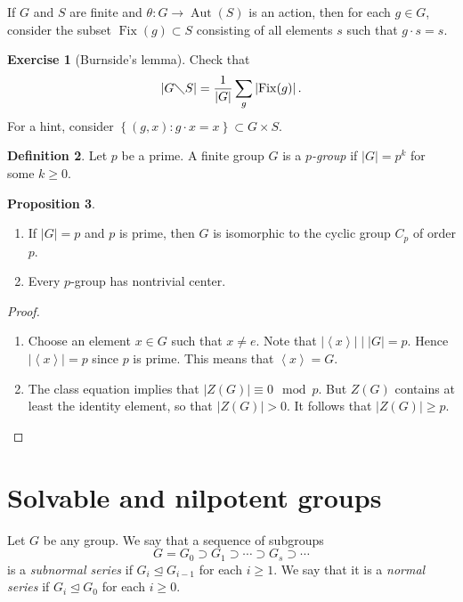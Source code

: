 \documentclass[10pt,letterpaper,cm]{nupset}
\theoremstyle{definition}
\newtheorem{definition}{Definition}[subsection]
\theoremstyle{theorem}
\newtheorem{prop}[definition]{Proposition}
\newtheorem{exercise}[definition]{Exercise}
\theoremstyle{remark}
\newcommand{\1}{\mathbf{1}}
\newcommand{\0}{\vec 0}
\DeclareMathOperator{\aut}{Aut}
\DeclareMathOperator{\fix}{Fix}
\begin{document}
If $G$ and $S$ are finite and $\theta : G \to \aut(S)$ is an action, then for each $g\in G$, consider the subset $\fix(g) \subset S$ consisting of all elements $s$ such that $g \cdot s = s$.

\begin{exercise}[Burnside's lemma]   Check that $$\left\lvert{G \diagdown S}\right\rvert = \frac{1}{\left\lvert{G}\right\rvert} \sum_g \left\lvert{\fix(g)}\right\rvert.$$ For a hint, consider $\left\{(g,x): g \cdot x=x\right\} \subset G \times S$.
\end{exercise}
 
\begin{definition}
Let $p$ be a prime. A finite group $G$ is a \textit{$p$-group} if $\left\lvert{G}\right\rvert = p^k$ for some $k \geq 0$. 
\end{definition}

\begin{prop}  $ $
\begin{enumerate}
\item If $\left\lvert{G}\right\rvert = p$ and $p$ is prime, then $G$ is isomorphic to the cyclic group $C_p$ of order $p$.
\item Every $p$-group has nontrivial center.
\end{enumerate}
\end{prop}
\begin{proof} $ $
\begin{enumerate}
\item Choose an element $x\in G$ such that $x\ne e$. Note that $\left\lvert{\left\langle x\right\rangle}\right\rvert \mid \left\lvert{G}\right\rvert =p$. Hence $\left\lvert{\left\langle x\right\rangle}\right\rvert = p$ since $p$ is prime. This means that $\left\langle x\right\rangle = G$.
\item The class equation implies that $\left\lvert{Z(G)}\right\rvert \equiv 0 \mod p$. But $Z(G)$ contains at least the identity element, so that $\left\lvert{Z(G)}\right\rvert>0$. It follows that $\left\lvert{Z(G)}\right\rvert\geq p$.
\end{enumerate}
\end{proof}

\section{Solvable and nilpotent groups}

Let $G$ be any group.
We say that a sequence of subgroups $$  G= G_0 \supset G_1 \supset \cdots \supset G_s \supset \cdots    $$ is a \textit{subnormal series} if $G_i \unlhd G_{i-1}$ for each $i\geq 1$. We say that it is a \textit{normal series} if $G_i \unlhd G_0$ for each $i\geq 0$. 
\end{document}
